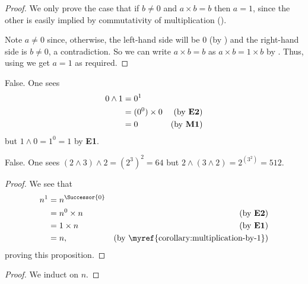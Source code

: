 \begin{questions}
    \item \begin{proof}
        We only prove the case that if $b \neq 0$ and $a \times b = b$ then $a = 1$, since the other is easily implied by commutativity of multiplication ().
    
        Note $a \neq 0$ since, otherwise, the left-hand side will be 0 (by ) and the right-hand side is $b \neq 0$, a contradiction. So we can write $a \times b = b$ as $a \times b = 1 \times b$ by . Thus, using  we get $a = 1$ as required.
    \end{proof}

    \item \begin{partquestions}{\alph*}
        \item False. One sees
        \begin{align*}
            0 \wedge 1 &= 0^1\\
            &= (0^0) \times 0 & (\text{by \textbf{E2}})\\
            &= 0 & (\text{by \textbf{M1}})
        \end{align*}
        but $1 \wedge 0 = 1^0 = 1$ by \textbf{E1}.
        \item False. One sees $(2\wedge 3)\wedge2 = \left(2^3\right)^2 = 64$ but $2\wedge (3\wedge 2) = 2^{\left(3^2\right)} = 512$.
    \end{partquestions}

    \item \begin{proof}
        We see that
        \begin{align*}
            n^1 &= n^\Successor{0}\\
            &= n^0 \times n & (\text{by \textbf{E2}})\\
            &= 1 \times n & (\text{by \textbf{E1}})\\
            &= n, & (\text{by \myref{corollary:multiplication-by-1}})
        \end{align*}
        proving this proposition.
    \end{proof}

    \item \begin{proof}
        We induct on $n$.


\end{proof}
\end{questions}
